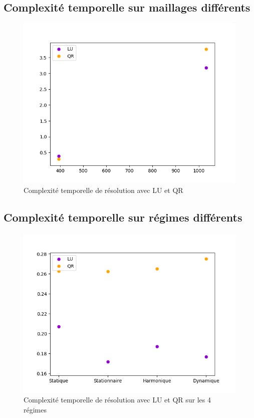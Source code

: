 \documentclass{article}[11pt]
\begin{document}
\subsection{Complexité temporelle sur maillages différents}
\begin{figure}[!h]
    \centering
    \includegraphics[width=18cm]{res/plots/complexite.png}
    \caption{Complexité temporelle de résolution avec LU et QR}
    \label{fig:compRef}
\end{figure}
\subsection{Complexité temporelle sur régimes différents}
\begin{figure}[!h]
    \centering
    \includegraphics[width=18cm]{res/plots/regimes.png}
    \caption{Complexité temporelle de résolution avec LU et QR sur les 4 régimes}
    \label{fig:compReg}
\end{figure}
\end{document}
